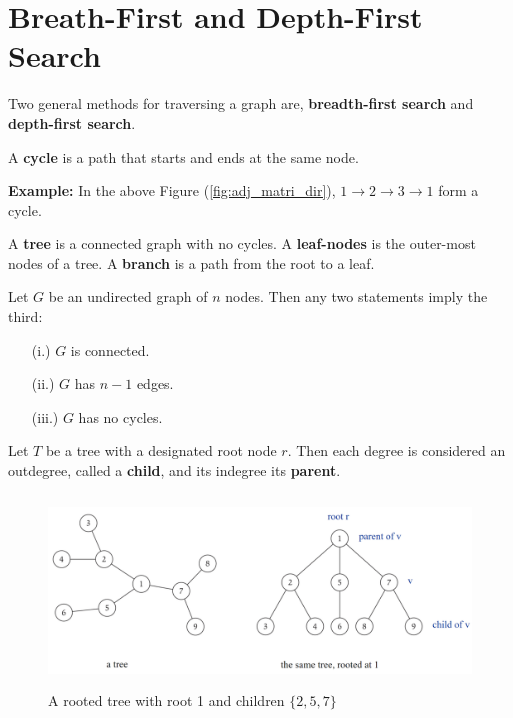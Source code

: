 \section{Breath-First and Depth-First Search}
Two general methods for traversing a graph are, \textbf{breadth-first search} and \textbf{depth-first search}.

\begin{Def}[Cycle]

    A \textbf{cycle} is a path that starts and ends at the same node.
\end{Def}
\textbf{Example:} In the above Figure (\ref{fig:adj_matri_dir}), $1\rightarrow 2 \rightarrow 3 \rightarrow 1$ form a cycle.
\begin{Def}[Tree]

    A \textbf{tree} is a connected graph with no cycles. A \textbf{leaf-nodes} is the outer-most nodes of a tree. A \textbf{branch} is a path from the root to a leaf.  
\end{Def}
\newpage
\begin{theo}

    Let $G$ be an undirected graph of $n$ nodes. Then any two statements imply the third:
    \begin{enumerate}
        \item [(i.)] $G$ is connected.
        \item [(ii.)] $G$ has $n-1$ edges.
        \item [(iii.)] $G$ has no cycles.
    \end{enumerate}
\end{theo}

\begin{Def}
    
        Let $T$ be a tree with a designated root node $r$. Then each degree is 
        considered an outdegree, called a \textbf{child}, and its indegree its \textbf{parent}.
\end{Def}
\begin{figure}[h]
    \begin{center}
      \includegraphics[height=2in]{./Sections/graphs/rooted_tree.png}
    \end{center}
     \caption{A rooted tree with root 1 and children $\{2,5,7\}$}\label{fig:rooted_tree}
  \end{figure}

